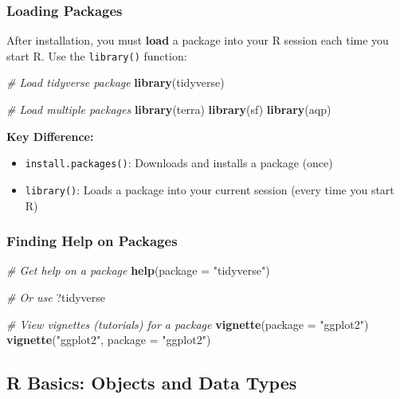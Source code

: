 \documentclass[
  10pt,
  b5paper,
  oneside]{book}
\newenvironment{Shaded}{\begin{snugshade}}{\end{snugshade}}
\newcommand{\AttributeTok}[1]{\textcolor[rgb]{0.13,0.29,0.53}{#1}}
\newcommand{\CommentTok}[1]{\textcolor[rgb]{0.56,0.35,0.01}{\textit{#1}}}
\newcommand{\FunctionTok}[1]{\textcolor[rgb]{0.13,0.29,0.53}{\textbf{#1}}}
\newcommand{\NormalTok}[1]{#1}
\newcommand{\StringTok}[1]{\textcolor[rgb]{0.31,0.60,0.02}{#1}}
\providecommand{\tightlist}{%
  \setlength{\itemsep}{0pt}\setlength{\parskip}{0pt}}
\begin{document}
\subsubsection{Loading Packages}\label{loading-packages}

After installation, you must \textbf{load} a package into your R session each time you start R.
Use the \texttt{library()} function:

\begin{Shaded}
\begin{Highlighting}[]
\CommentTok{\# Load tidyverse package}
\FunctionTok{library}\NormalTok{(tidyverse)}

\CommentTok{\# Load multiple packages}
\FunctionTok{library}\NormalTok{(terra)}
\FunctionTok{library}\NormalTok{(sf)}
\FunctionTok{library}\NormalTok{(aqp)}
\end{Highlighting}
\end{Shaded}

\textbf{Key Difference:}

\begin{itemize}
\tightlist
\item
  \texttt{install.packages()}: Downloads and installs a package (once)
\item
  \texttt{library()}: Loads a package into your current session (every time you start R)
\end{itemize}

\subsubsection{Finding Help on Packages}\label{finding-help-on-packages}

\begin{Shaded}
\begin{Highlighting}[]
\CommentTok{\# Get help on a package}
\FunctionTok{help}\NormalTok{(}\AttributeTok{package =} \StringTok{"tidyverse"}\NormalTok{)}

\CommentTok{\# Or use}
\NormalTok{?tidyverse}

\CommentTok{\# View vignettes (tutorials) for a package}
\FunctionTok{vignette}\NormalTok{(}\AttributeTok{package =} \StringTok{"ggplot2"}\NormalTok{)}
\FunctionTok{vignette}\NormalTok{(}\StringTok{"ggplot2"}\NormalTok{, }\AttributeTok{package =} \StringTok{"ggplot2"}\NormalTok{)}
\end{Highlighting}
\end{Shaded}

\subsection{R Basics: Objects and Data Types}\label{object-types}
\end{document}
